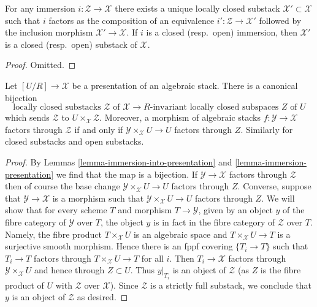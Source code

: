 \begin{lemma}
\label{lemma-substack-image}
For any immersion $i : \mathcal{Z} \to \mathcal{X}$ there exists a
unique locally closed substack $\mathcal{X}' \subset \mathcal{X}$
such that $i$ factors as the composition of
an equivalence $i' : \mathcal{Z} \to \mathcal{X}'$
followed by the inclusion morphism $\mathcal{X}' \to \mathcal{X}$.
If $i$ is a closed (resp.\ open) immersion, then $\mathcal{X}'$
is a closed (resp.\ open) substack of $\mathcal{X}$.
\end{lemma}

\begin{proof}
Omitted.
\end{proof}

\begin{lemma}
\label{lemma-substacks-presentation}
Let $[U/R] \to \mathcal{X}$ be a presentation of an algebraic stack.
There is a canonical bijection
$$
\text{locally closed substacks }\mathcal{Z}\text{ of }\mathcal{X}
\longrightarrow
R\text{-invariant locally closed subspaces }Z\text{ of }U
$$
which sends $\mathcal{Z}$ to $U \times_\mathcal{X} \mathcal{Z}$.
Moreover, a morphism of algebraic stacks $f : \mathcal{Y} \to \mathcal{X}$
factors through $\mathcal{Z}$ if and only if
$\mathcal{Y} \times_\mathcal{X} U \to U$ factors through $Z$.
Similarly for closed substacks and open substacks.
\end{lemma}

\begin{proof}
By Lemmas \ref{lemma-immersion-into-presentation} and
\ref{lemma-immersion-presentation}
we find that the map is a bijection.
If $\mathcal{Y} \to \mathcal{X}$ factors through $\mathcal{Z}$
then of course the base change $\mathcal{Y} \times_\mathcal{X} U \to U$
factors through $Z$. Converse, suppose that $\mathcal{Y} \to \mathcal{X}$
is a morphism such that $\mathcal{Y} \times_\mathcal{X} U \to U$
factors through $Z$. We will show that for every scheme $T$ and
morphism $T \to \mathcal{Y}$,
given by an object $y$ of the fibre category of $\mathcal{Y}$ over $T$,
the object $y$ is in fact in the fibre category of $\mathcal{Z}$ over $T$.
Namely, the fibre product $T \times_\mathcal{X} U$ is an algebraic
space and $T \times_\mathcal{X} U \to T$ is a surjective smooth morphism.
Hence there is an fppf covering $\{T_i \to T\}$ such that
$T_i \to T$ factors through $T \times_\mathcal{X} U \to T$ for all $i$.
Then $T_i \to \mathcal{X}$ factors through $\mathcal{Y} \times_\mathcal{X} U$
and hence through $Z \subset U$. Thus $y|_{T_i}$ is an object of
$\mathcal{Z}$ (as $Z$ is the fibre product of $U$ with
$\mathcal{Z}$ over $\mathcal{X}$).
Since $\mathcal{Z}$ is a strictly full substack, we conclude
that $y$ is an object of $\mathcal{Z}$ as desired.
\end{proof}

